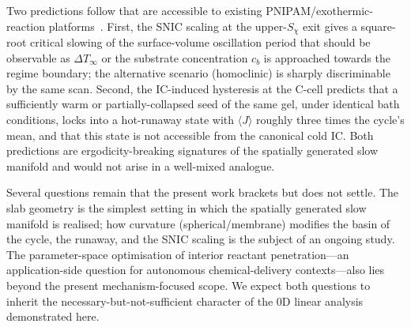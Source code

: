 \documentclass[aps,pre,reprint,superscriptaddress,longbibliography,floatfix]{revtex4-2}
\begin{document}
Two predictions follow that are accessible to existing
PNIPAM/exothermic-reaction
platforms~\cite{Yoshida2014,Yashin2012,Halperin2015}. First, the
SNIC scaling at the upper-$S_\chi$ exit gives a square-root critical
slowing of the surface-volume oscillation period that should be
observable as $\Delta T_\infty$ or the substrate concentration $c_b$
is approached towards the regime boundary; the alternative scenario
(homoclinic) is sharply discriminable by the same scan. Second, the
IC-induced hysteresis at the C-cell predicts that a sufficiently warm
or partially-collapsed seed of the same gel, under identical bath
conditions, locks into a hot-runaway state with $\langle J\rangle$
roughly three times the cycle's mean, and that this state is not
accessible from the canonical cold IC. Both predictions are
ergodicity-breaking signatures of the spatially generated slow
manifold and would not arise in a well-mixed analogue.

Several questions remain that the present work brackets but does not
settle. The slab geometry is the simplest setting in which the
spatially generated slow manifold is realised; how curvature
(spherical/membrane) modifies the basin of the cycle, the runaway,
and the SNIC scaling is the subject of an ongoing study. The
parameter-space optimisation of interior reactant penetration---an
application-side question for autonomous chemical-delivery
contexts---also lies beyond the present mechanism-focused scope. We
expect both questions to inherit the necessary-but-not-sufficient
character of the 0D linear analysis demonstrated here.

\begin{acknowledgments}
\end{acknowledgments}
\end{document}
